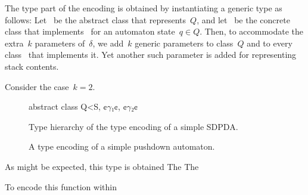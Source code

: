 The type part of the encoding is obtained by instantiating a generic type as follows:
Let~ be the abstract class that represents~$Q$, and let~ be the concrete class that
  implements~ for an automaton state~$q∈Q$.
Then, to accommodate the extra~$k$ parameters of~$δ$, we add~$k$ generic parameters
  to class~$Q$ and to every class~ that implements it.
Yet another such parameter is added for representing stack contents.

Consider the case~$k=2$.
\begin{figure}
  \begin{JAVA}
abstract class Q<S, ¢$γ₁$¢, ¢$γ₂$¢
  \end{JAVA}
\end{figure}

\begin{figure}
  \caption{\label{Figure:SDPDA:hierarchy}%
    Type hierarchy of the type encoding of a simple SDPDA.
  }
  \begin{adjustbox}{}
    
  \end{adjustbox}
\end{figure}

\begin{figure}
  \caption{\label{Figure:SDPDA:example}%
    A type encoding of a simple pushdown automaton.
  }
\end{figure}
As might be expected, this type is obtained
The
The

To encode this function within
